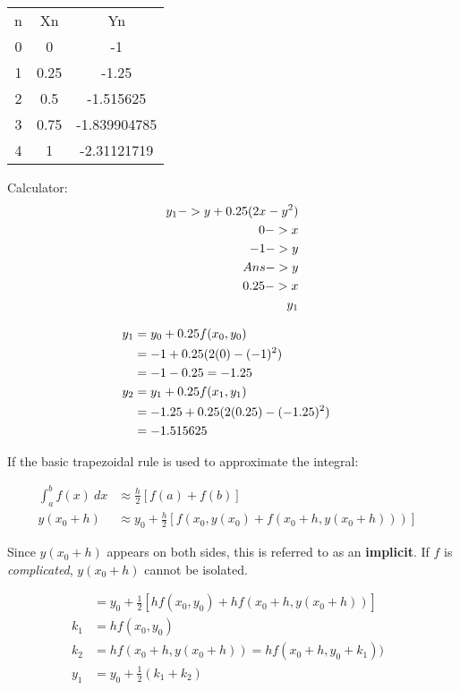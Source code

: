 		\begin{table}[H]
			\begin{tabular}{|c|c|c|}
				\hline
				n & Xn & Yn \hline \\
				0 & 0 & -1 \hline \\
				1 & 0.25 & -1.25 \hline \\
				2 & 0.5 & -1.515625 \hline \\
				3 & 0.75 & -1.839904785 \hline \\
				4 & 1 & -2.31121719 \hline
			\end{tabular}
		\end{table}

		Calculator:
		\begin{align}
			y_{1} -> y + 0.25(2x-y^{2}) \notag \\
			0 -> x \notag \\
			-1->y \notag \\
			Ans -> y \notag \\
			0.25 -> x \notag \\
			y_{1} \notag
		\end{align}

		\begin{align}
			y_{1} &= y_{0} + 0.25f(x_{0}, y_{0})& \notag \\
			&= -1 + 0.25(2(0) - (-1)^{2})& \notag \\
			&= -1 - 0.25 = -1.25 \\
			y_{2} &= y_{1} + 0.25f(x_{1},y_{1})& \notag \\
			&= -1.25 + 0.25(2(0.25) - (-1.25)^{2}) \notag \\
			&= -1.515625&
		\end{align}

		If the basic trapezoidal rule is used to approximate the integral:

		\begin{align}
			\int_{a}^{b} f(x) \ dx &\approx \frac{h}{2} \left[ f(a) + f(b) \right]& \\
			y(x_{0}+h) &\approx y_{0} + \frac{h}{2}\left[ f(x_{0}, y(x_{0})+f(x_{0}+h, y(x_{0}+h)))\right]
		\end{align}

		Since $y(x_{0}+h)$ appears on both sides, this is referred to as an \textbf{implicit}. If $f$ is \textit{complicated}, $y(x_{0}+h)$ cannot be isolated.

		\begin{align}
			&= y_{0} + \frac{1}{2}\left[ hf(x_{0},y_{0}) + hf(x_{0}+h, y(x_{0}+h))\right]& \\
			k_{1} &= hf(x_{0},y_{0})& \\
			k_{2} &= hf(x_{0}+h, y(x_{0}+h)) = hf(x_{0}+h, y_{0} + k_{1}))& \\
			y_{1} &= y_{0} + \frac{1}{2}(k_{1}+k_{2})&
		\end{align}

